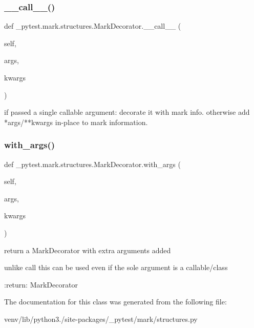 \subsubsection{\texorpdfstring{\+\_\+\+\_\+call\+\_\+\+\_\+()}{\_\_call\_\_()}}
{\footnotesize\ttfamily def \+\_\+pytest.\+mark.\+structures.\+Mark\+Decorator.\+\_\+\+\_\+call\+\_\+\+\_\+ (\begin{DoxyParamCaption}\item[{}]{self,  }\item[{}]{args,  }\item[{}]{kwargs }\end{DoxyParamCaption})}

\begin{DoxyVerb}if passed a single callable argument: decorate it with mark info.
    otherwise add *args/**kwargs in-place to mark information. \end{DoxyVerb}
 \mbox{\label{class__pytest_1_1mark_1_1structures_1_1_mark_decorator_a32ce2a8c2fe231d04e4485952d742f77}} 
\subsubsection{\texorpdfstring{with\+\_\+args()}{with\_args()}}
{\footnotesize\ttfamily def \+\_\+pytest.\+mark.\+structures.\+Mark\+Decorator.\+with\+\_\+args (\begin{DoxyParamCaption}\item[{}]{self,  }\item[{}]{args,  }\item[{}]{kwargs }\end{DoxyParamCaption})}

\begin{DoxyVerb}return a MarkDecorator with extra arguments added

unlike call this can be used even if the sole argument is a callable/class

:return: MarkDecorator
\end{DoxyVerb}
 

The documentation for this class was generated from the following file\+:\begin{DoxyCompactItemize}
\item 
venv/lib/python3./site-\/packages/\+\_\+pytest/mark/structures.\+py\end{DoxyCompactItemize}
